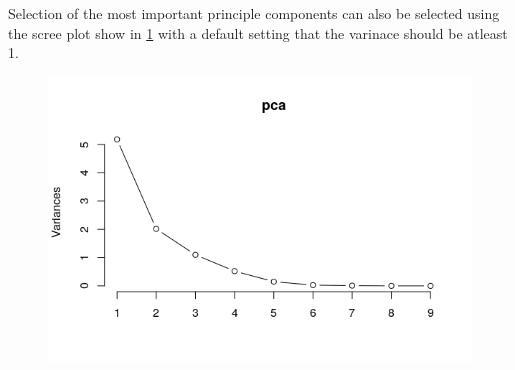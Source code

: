 \documentclass[12pt,a4paper]{article}
\begin{document}
\begin{enumerate}[label=\roman*)]
\noindent Selection of the most important principle components can also be selected using the scree plot show in \ref{fig:screep} with a default setting that the varinace should be atleast 1.


\begin{figure}[h]
	\centering
	\includegraphics[width=0.7\linewidth]{ScreeP}
	\caption{}
	\label{fig:screep}
\end{figure}


\end{enumerate}
\end{document}
